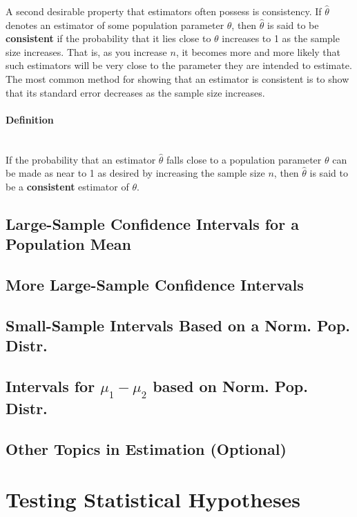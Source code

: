 \documentclass{article}
\newcommand{\p}[1]{\paragraph{#1}} %
\begin{document}
	A second desirable property that estimators often possess is consistency. If $\hat{\theta}$ 
	denotes an estimator of some population parameter $\theta$, then $\hat{\theta}$ is said to be 
	\textbf{consistent} if the probability that it lies close to $\theta$ increases to 1 as the sample size 
	increases. That is, as you increase $n$, it becomes more and more likely that such estimators 
	will be very close to the parameter they are intended to estimate. The most common method for 
	showing that an estimator is consistent is to show that its standard error decreases as the 
	sample size increases.
	
	\p{Definition} ~\\
	If the probability that an estimator $\hat{\theta}$ falls close to a population parameter $\theta$ 
	can be made as near to 1 as desired by increasing the sample size $n$, then $\hat{\theta}$ is 
	said to be a \textbf{consistent} estimator of $\theta$.
	
	\subsection{Large-Sample Confidence Intervals for a Population Mean} %
	
	\subsection{More Large-Sample Confidence Intervals} %
	
	\subsection{Small-Sample Intervals Based on a Norm. Pop. Distr.} %
	
	\subsection{Intervals for $\mu_1 - \mu_2$ based on Norm. Pop. Distr.} %
	
	\subsection{Other Topics in Estimation (Optional)} %

\clearpage	
\section{Testing Statistical Hypotheses} %
\end{document}
